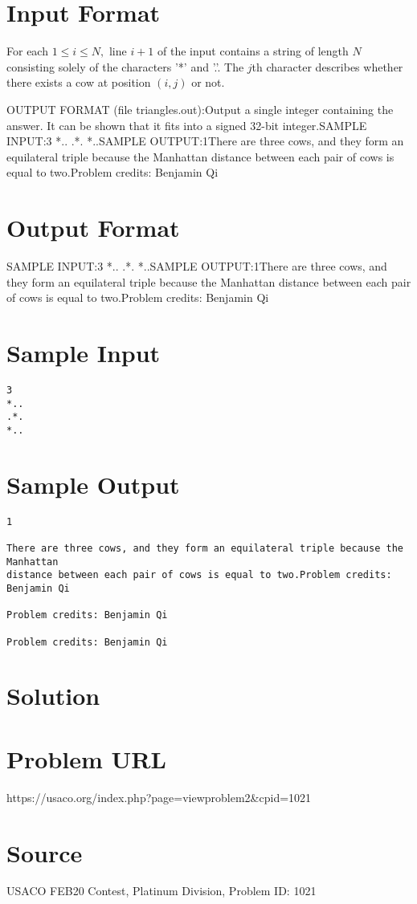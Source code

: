 \documentclass[12pt]{article}
\begin{document}
\section*{Input Format}
For each $1\le i\le N,$ line $i+1$ of the input contains a string of length $N$
consisting solely of the characters '*' and '.'. The $j$th character 
describes whether there exists a cow at position $(i,j)$ or not.

OUTPUT FORMAT (file triangles.out):Output a single integer containing the answer. It can be shown that it fits into
a signed 32-bit integer.SAMPLE INPUT:3
*..
.*.
*..SAMPLE OUTPUT:1There are three cows, and they form an equilateral triple because the Manhattan
distance between each pair of cows is equal to two.Problem credits: Benjamin Qi

\section*{Output Format}
SAMPLE INPUT:3
*..
.*.
*..SAMPLE OUTPUT:1There are three cows, and they form an equilateral triple because the Manhattan
distance between each pair of cows is equal to two.Problem credits: Benjamin Qi

\section*{Sample Input}
\begin{verbatim}
3
*..
.*.
*..
\end{verbatim}

\section*{Sample Output}
\begin{verbatim}
1

There are three cows, and they form an equilateral triple because the Manhattan
distance between each pair of cows is equal to two.Problem credits: Benjamin Qi

Problem credits: Benjamin Qi

Problem credits: Benjamin Qi
\end{verbatim}

\section*{Solution}


\section*{Problem URL}
https://usaco.org/index.php?page=viewproblem2&cpid=1021

\section*{Source}
USACO FEB20 Contest, Platinum Division, Problem ID: 1021
\end{document}
